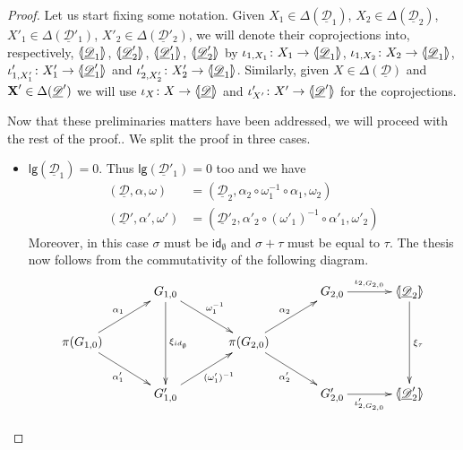 \documentclass[a4paper,UKenglish,cleveref,pdftex,thm-restate,numberwithinsect,anonymous]{lipics}
\newcommand{\id}[1]{\mathsf{id}_{#1}}
\def\X{\textbf {\textup{X}}}
\newcommand{\dder}[1]{\mathscr{#1}}
\newcommand{\der}[1]{\underline{\dder{#1}}}
\newcommand{\lpro}{\langle \hspace{-1.85pt}[}
\newcommand{\rpro}{]\hspace{-1.85pt}\rangle}
\newcommand{\tpro}[1]{\lpro \der{#1}\rpro}
\newcommand{\lgh}[0]{\mathsf{lg}}
\begin{document}
\begin{proof}
  Let us start fixing some notation. Given $X_1\in \Delta(\der{D}_1)$,
  $X_2\in \Delta(\der{D}_2)$, $X'_1\in \Delta(\der{D}'_1)$,
  $X'_2\in \Delta(\der{D}'_2)$, we will denote their coprojections
  into, respectively, $\lpro \der{D}_1\rpro$, $\lpro \der{D}'_2\rpro$,
  $\lpro \der{D}'_1\rpro$, $\lpro \der{D}'_2\rpro$ by
  $\iota_{1, X_1}\colon X_1\to \lpro\der{D}_1\rpro$,
  $\iota_{1, X_2}\colon X_2\to \lpro\der{D}_1\rpro$,
  $\iota'_{1, X'_1}\colon X'_1\to \lpro\der{D}'_1\rpro$ and
  $\iota'_{2, X'_2}\colon X'_2\to \lpro\der{D}_1\rpro$. Similarly,
  given $X\in \Delta(\der{D})$ and $\X'\in \Delta(\der{D}')$ we will
  use $\iota_X\colon X\to \tpro{D}$ and
  $\iota'_{X'}\colon X'\to \lpro \der{D}' \rpro$ for the
  coprojections.

  Now that these preliminaries matters have been addressed, we will proceed with the rest of the proof.. We split the proof in three cases.
  \begin{itemize}
  \item $\lgh(\der{D}_1)=0$. Thus $\lgh(\der{D}'_1)=0$ too  and we have
    \begin{align*}
      (\der{D}, \alpha, \omega) & =(\der{D}_2, \alpha_2\circ \omega_1^{-1}\circ \alpha_1, \omega_2) \\ (\der{D}', \alpha', \omega')&=(\der{D}'_2, \alpha'_2\circ (\omega'_1)^{-1}\circ \alpha'_1, \omega'_2)
    \end{align*}
    Moreover, in this case $\sigma$ must be $\id{\emptyset}$ and $\sigma+\tau$ must be equal to $\tau$. The thesis now follows from the commutativity of the following diagram.
    \[\xymatrix@C=35pt{& G_{1,0}\ar[dd]^{\xi_{\id{\emptyset}}} \ar[dr]^{\omega^{-1}_1}&&G_{2,0}\ar[r]^-{\iota_{2, G_{2,0}}} & \lpro \der{D}_2\rpro \ar[dd]^{\xi_{\tau}}\\\pi(G_{1,0})  \ar[ur]^{\alpha_1} \ar[dr]_{\alpha'_1}&& \pi(G_{2,0}) \ar[ur]^{\alpha_2} \ar[dr]_{\alpha'_2}\\& G'_{1,0} \ar[ur]_{(\omega'_1)^{-1}}&&G'_{2,0} \ar[r]_-{\iota'_{2, G_{2,0}}}& \lpro \der{D}'_2\rpro}\]


\end{itemize}
\end{proof}
\end{document}

